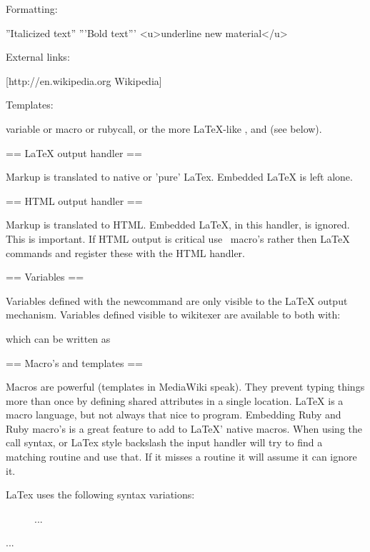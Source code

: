 Formatting:

''Italicized text''
'''Bold text'''
<u>underline new material</u>

External links:

[http://en.wikipedia.org Wikipedia]

Templates:

{{variable}} or {{macro}} or {{rubycall}}, or the more LaTeX-like
\variable, \macro and \rubycall (see below).


== LaTeX output handler ==

Markup is translated to native or 'pure' LaTex. Embedded LaTeX is left alone.


== HTML output handler ==

Markup is translated to HTML. Embedded LaTeX, in this handler, is
ignored. This is important. If HTML output is critical use
\wikitexer\ macro's
rather then LaTeX commands and register these with the HTML handler.

== Variables ==

Variables defined with the newcommand are only visible to the LaTeX
output mechanism. Variables defined visible to wikitexer are available
to both with:


which can be written as


== Macro's and templates ==

Macros are powerful (templates in MediaWiki speak). They prevent
typing things more than once by defining shared attributes in a single
location.  LaTeX is a macro language, but not always that nice to
program.  Embedding Ruby and Ruby macro's is a great feature to add to
LaTeX' native macros. When using the {{call}} syntax, or LaTex style
backslash \call the input handler will try to find a matching routine
and use that. If it misses a routine it will assume it can ignore it.

LaTex uses the following syntax variations:

	\hfill
	\caption{This is the caption.\label{fig:rawss}}

  \begin{figure} ... \end{figure}
  \begin{minipage}[t]{0.58\linewidth} ... \end{minipage} %

